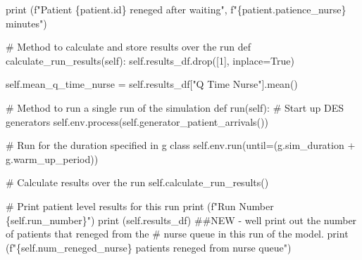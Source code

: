 \documentclass[
  letterpaper,
  DIV=11,
  numbers=noendperiod]{scrreprt}
\newenvironment{Shaded}{\begin{snugshade}}{\end{snugshade}}
\newcommand{\BuiltInTok}[1]{\textcolor[rgb]{0.00,0.23,0.31}{#1}}
\newcommand{\CommentTok}[1]{\textcolor[rgb]{0.37,0.37,0.37}{#1}}
\newcommand{\DecValTok}[1]{\textcolor[rgb]{0.68,0.00,0.00}{#1}}
\newcommand{\KeywordTok}[1]{\textcolor[rgb]{0.00,0.23,0.31}{#1}}
\newcommand{\NormalTok}[1]{\textcolor[rgb]{0.00,0.23,0.31}{#1}}
\newcommand{\OperatorTok}[1]{\textcolor[rgb]{0.37,0.37,0.37}{#1}}
\newcommand{\SpecialCharTok}[1]{\textcolor[rgb]{0.37,0.37,0.37}{#1}}
\newcommand{\SpecialStringTok}[1]{\textcolor[rgb]{0.13,0.47,0.30}{#1}}
\newcommand{\StringTok}[1]{\textcolor[rgb]{0.13,0.47,0.30}{#1}}
\newcommand{\VariableTok}[1]{\textcolor[rgb]{0.07,0.07,0.07}{#1}}
\begin{document}
\begin{tcolorbox}
\begin{Shaded}
\begin{Highlighting}[]
                \BuiltInTok{print}\NormalTok{ (}\SpecialStringTok{f"Patient }\SpecialCharTok{\{}\NormalTok{patient}\SpecialCharTok{.}\BuiltInTok{id}\SpecialCharTok{\}}\SpecialStringTok{ reneged after waiting"}\NormalTok{,}
                       \SpecialStringTok{f"}\SpecialCharTok{\{}\NormalTok{patient}\SpecialCharTok{.}\NormalTok{patience\_nurse}\SpecialCharTok{\}}\SpecialStringTok{ minutes"}\NormalTok{)}

    \CommentTok{\# Method to calculate and store results over the run}
    \KeywordTok{def}\NormalTok{ calculate\_run\_results(}\VariableTok{self}\NormalTok{):}
        \VariableTok{self}\NormalTok{.results\_df.drop([}\DecValTok{1}\NormalTok{], inplace}\OperatorTok{=}\VariableTok{True}\NormalTok{)}

        \VariableTok{self}\NormalTok{.mean\_q\_time\_nurse }\OperatorTok{=} \VariableTok{self}\NormalTok{.results\_df[}\StringTok{"Q Time Nurse"}\NormalTok{].mean()}

    \CommentTok{\# Method to run a single run of the simulation}
    \KeywordTok{def}\NormalTok{ run(}\VariableTok{self}\NormalTok{):}
        \CommentTok{\# Start up DES generators}
        \VariableTok{self}\NormalTok{.env.process(}\VariableTok{self}\NormalTok{.generator\_patient\_arrivals())}

        \CommentTok{\# Run for the duration specified in g class}
        \VariableTok{self}\NormalTok{.env.run(until}\OperatorTok{=}\NormalTok{(g.sim\_duration }\OperatorTok{+}\NormalTok{ g.warm\_up\_period))}

        \CommentTok{\# Calculate results over the run}
        \VariableTok{self}\NormalTok{.calculate\_run\_results()}

        \CommentTok{\# Print patient level results for this run}
        \BuiltInTok{print}\NormalTok{ (}\SpecialStringTok{f"Run Number }\SpecialCharTok{\{}\VariableTok{self}\SpecialCharTok{.}\NormalTok{run\_number}\SpecialCharTok{\}}\SpecialStringTok{"}\NormalTok{)}
        \BuiltInTok{print}\NormalTok{ (}\VariableTok{self}\NormalTok{.results\_df)}
        \CommentTok{\#\#NEW {-} we\textquotesingle{}ll print out the number of patients that reneged from the}
        \CommentTok{\# nurse queue in this run of the model.}
        \BuiltInTok{print}\NormalTok{ (}\SpecialStringTok{f"}\SpecialCharTok{\{}\VariableTok{self}\SpecialCharTok{.}\NormalTok{num\_reneged\_nurse}\SpecialCharTok{\}}\SpecialStringTok{ patients reneged from nurse queue"}\NormalTok{)}


\end{Highlighting}
\end{Shaded}
\end{tcolorbox}
\end{document}
